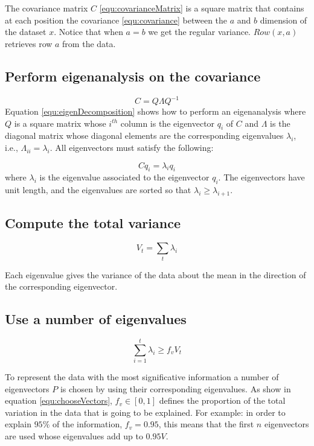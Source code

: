 The covariance matrix $C$ \ref{equ:covarianceMatrix} is a square matrix that contains at each position the covariance \ref{equ:covariance} between 
the $a$ and $b$ dimension of the dataset $x$. Notice that when $a = b$ we get the regular variance.
$Row(x, a)$ retrieves row $a$ from the data. 

\subsection{Perform eigenanalysis on the covariance}

\begin{equation}
 C = Q \Lambda Q^{-1}
 \label{equ:eigenDecomposition}
\end{equation}
Equation \ref{equ:eigenDecomposition} shows how to perform an eigenanalysis
where $Q$ is a square matrix whose $i^{th}$ column is the eigenvector $q_i$
of $C$ and $\Lambda$ is the diagonal matrix whose diagonal elements are the 
corresponding eigenvalues $\lambda_i$, i.e., $\Lambda_{ii}=\lambda_i$.
All eigenvectors must satisfy the following:

\begin{equation}
 C q_i = \lambda_i q_i 
 \label{equ:eigenAnalysis}
\end{equation}
where $\lambda_i$ is the eigenvalue associated to the eigenvector $q_i$. 
The eigenvectors have unit length, and the eigenvalues 
are sorted so that $\lambda_i \geq \lambda_{i+1}$.

\subsection{Compute the total variance}

\begin{equation}
 V_t = \sum_t \lambda_i
 \label{equ:totalVariance}
\end{equation}

Each eigenvalue gives the variance of the data about the mean in the
direction of the corresponding eigenvector. 

\subsection{Use a number of eigenvalues}

\begin{equation}
 \sum_{i=1}^t \lambda_i \geq f_v V_t
 \label{equ:chooseVectors}
\end{equation}

To represent the data with the most significative information a number of eigenvectors $P$ is chosen
by using their corresponding eigenvalues. 
As show in equation \ref{equ:chooseVectors}, $f_v \in [0, 1]$ defines the proportion of the total variation 
in the data that is going to be explained. 
For example: in order to explain $95\%$ of the information, $f_v = 0.95$, this means that
the first $n$ eigenvectors are used whose eigenvalues add up to $0.95 V$.


